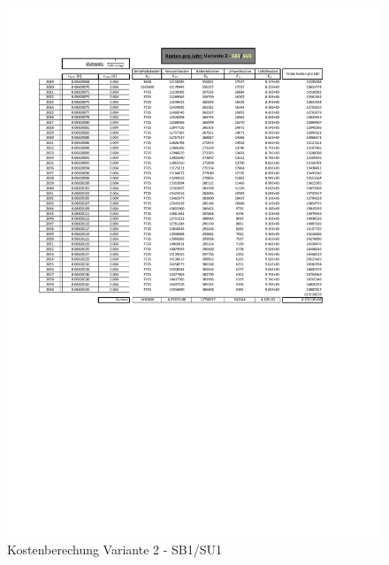 \begin{figure}[h!]
	\centering
	\includegraphics[width=\textwidth]{figures/Anhang/f-00-A-V2-B1-U1}
	\caption{Kostenberechung Variante 2 - SB1/SU1}
\end{figure}

